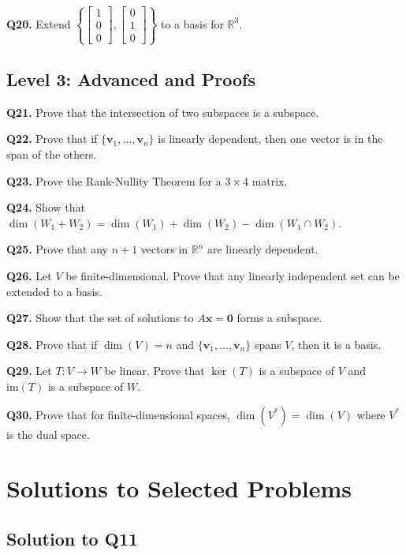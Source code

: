 \documentclass[12pt,a4paper]{article}
\theoremstyle{definition}
\begin{document}
\textbf{Q20.} Extend $\left\{\begin{bmatrix} 1 \\ 0 \\ 0 \end{bmatrix}, \begin{bmatrix} 0 \\ 1 \\ 0 \end{bmatrix}\right\}$ to a basis for $\mathbb{R}^3$.

\subsection{Level 3: Advanced and Proofs}

\textbf{Q21.} Prove that the intersection of two subspaces is a subspace.

\textbf{Q22.} Prove that if $\{\mathbf{v}_1, \ldots, \mathbf{v}_n\}$ is linearly dependent, then one vector is in the span of the others.

\textbf{Q23.} Prove the Rank-Nullity Theorem for a $3 \times 4$ matrix.

\textbf{Q24.} Show that $\dim(W_1 + W_2) = \dim(W_1) + \dim(W_2) - \dim(W_1 \cap W_2)$.

\textbf{Q25.} Prove that any $n + 1$ vectors in $\mathbb{R}^n$ are linearly dependent.

\textbf{Q26.} Let $V$ be finite-dimensional. Prove that any linearly independent set can be extended to a basis.

\textbf{Q27.} Show that the set of solutions to $A\mathbf{x} = \mathbf{0}$ forms a subspace.

\textbf{Q28.} Prove that if $\dim(V) = n$ and $\{\mathbf{v}_1, \ldots, \mathbf{v}_n\}$ spans $V$, then it is a basis.

\textbf{Q29.} Let $T: V \to W$ be linear. Prove that $\ker(T)$ is a subspace of $V$ and $\text{im}(T)$ is a subspace of $W$.

\textbf{Q30.} Prove that for finite-dimensional spaces, $\dim(V^*) = \dim(V)$ where $V^*$ is the dual space.

\section{Solutions to Selected Problems}

\subsection{Solution to Q11}
\end{document}
